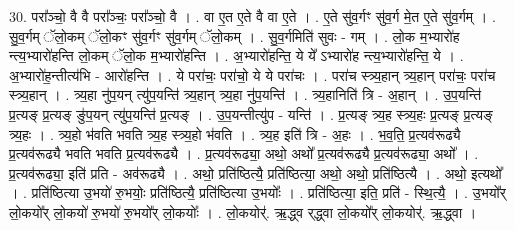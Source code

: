\documentclass[17pt]{extarticle}
\begin{document}
30. परा᳚ञ्चो॒ वै वै परा᳚ञ्चः॒ परा᳚ञ्चो॒ वै । . वा ए॒त ए॒ते वै वा ए॒ते । . ए॒ते सु॑व॒र्गꣳ सु॑व॒र्ग मे॒त ए॒ते सु॑व॒र्गम् । . सु॒व॒र्गम् ॅलो॒कम् ॅलो॒कꣳ सु॑व॒र्गꣳ सु॑व॒र्गम् ॅलो॒कम् । . सु॒व॒र्गमिति॑ सुवः - गम् । . लो॒क म॒भ्यारो॑ह न्त्य॒भ्यारो॑हन्ति लो॒कम् ॅलो॒क म॒भ्यारो॑हन्ति । . अ॒भ्यारो॑हन्ति॒ ये ये᳚ ऽभ्यारो॑ह न्त्य॒भ्यारो॑हन्ति॒ ये । . अ॒भ्यारो॑ह॒न्तीत्य॑भि - आरो॑हन्ति । . ये परा॑चः॒ परा॑चो॒ ये ये परा॑चः । . परा॑च स्त्र्य॒हान् त्र्य॒हान् परा॑चः॒ परा॑च स्त्र्य॒हान् । . त्र्य॒हा नु॑प॒यन् त्यु॑प॒यन्ति॑ त्र्य॒हान् त्र्य॒हा नु॑प॒यन्ति॑ । . त्र्य॒हानिति॑ त्रि - अ॒हान् । . उ॒प॒यन्ति॑ प्र॒त्यङ् प्र॒त्यङ् ङु॑प॒यन् त्यु॑प॒यन्ति॑ प्र॒त्यङ् । . उ॒प॒यन्तीत्यु॑प - यन्ति॑ । . प्र॒त्यङ् त्र्य॒ह स्त्र्य॒हः प्र॒त्यङ् प्र॒त्यङ् त्र्य॒हः । . त्र्य॒हो भ॑वति भवति त्र्य॒ह स्त्र्य॒हो भ॑वति । . त्र्य॒ह इति॑ त्रि - अ॒हः । . भ॒व॒ति॒ प्र॒त्यव॑रूढ्यै प्र॒त्यव॑रूढ्यै भवति भवति प्र॒त्यव॑रूढ्यै । . प्र॒त्यव॑रूढ्या॒ अथो॒ अथो᳚ प्र॒त्यव॑रूढ्यै प्र॒त्यव॑रूढ्या॒ अथो᳚ । . प्र॒त्यव॑रूढ्या॒ इति॑ प्रति - अव॑रूढ्यै । . अथो॒ प्रति॑ष्ठित्यै॒ प्रति॑ष्ठित्या॒ अथो॒ अथो॒ प्रति॑ष्ठित्यै । . अथो॒ इत्यथो᳚ । . प्रति॑ष्ठित्या उ॒भयो॑ रु॒भयोः॒ प्रति॑ष्ठित्यै॒ प्रति॑ष्ठित्या उ॒भयोः᳚ । . प्रति॑ष्ठित्या॒ इति॒ प्रति॑ - स्थि॒त्यै॒ । . उ॒भयो᳚र् लो॒कयो᳚र् लो॒कयो॑ रु॒भयो॑ रु॒भयो᳚र् लो॒कयोः᳚ । . लो॒कयोर्॑. ऋ॒द्ध्व र्‌द्ध्वा लो॒कयो᳚र् लो॒कयोर्॑. ऋ॒द्ध्वा । \newline
\end{document}
